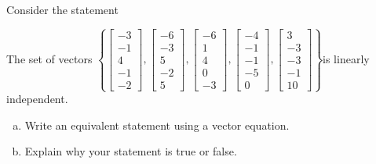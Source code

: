
\begin{exerciseStatement}


Consider the statement 
\begin{center}\begin{minipage}{0.8\textwidth}
 The set of vectors \( \left\{ \left[\begin{array}{c}
-3 \\
-1 \\
4 \\
-1 \\
-2
\end{array}\right] , \left[\begin{array}{c}
-6 \\
-3 \\
5 \\
-2 \\
5
\end{array}\right] , \left[\begin{array}{c}
-6 \\
1 \\
4 \\
0 \\
-3
\end{array}\right] , \left[\begin{array}{c}
-4 \\
-1 \\
-1 \\
-5 \\
0
\end{array}\right] , \left[\begin{array}{c}
3 \\
-3 \\
-3 \\
-1 \\
10
\end{array}\right] \right\} \)is linearly independent.
\end{minipage}\end{center}
    


\begin{enumerate}[(a)]
\item  Write an equivalent statement using a vector equation.
\item  Explain why your statement is true or false.
\end{enumerate}
    
\end{exerciseStatement}
    
